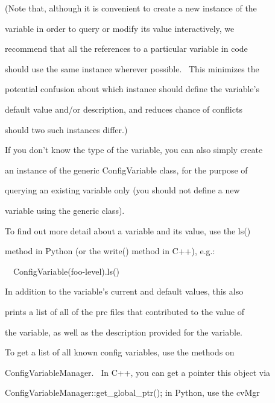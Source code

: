 \documentclass[a4paper]{article}
\begin{document}
{\color{black}
(Note that, although it is convenient to create a new instance of the}

{\color{black}
variable in order to query or modify its value interactively, we}

{\color{black}
recommend that all the references to a particular variable in code}

{\color{black}
should use the same instance wherever possible. \ This minimizes the}

{\color{black}
potential confusion about which instance should define the variable's}

{\color{black}
default value and/or description, and reduces chance of conflicts}

{\color{black}
should two such instances differ.)}


\bigskip

{\color{black}
If you don't know the type of the variable, you can also simply create}

{\color{black}
an instance of the generic ConfigVariable class, for the purpose of}

{\color{black}
querying an existing variable only (you should not define a new}

{\color{black}
variable using the generic class).}


\bigskip

{\color{black}
To find out more detail about a variable and its value, use the ls()}

{\color{black}
method in Python (or the write() method in C++), e.g.:}


\bigskip

{\color{black}
\ \ ConfigVariable({\textquotedbl}foo-level{\textquotedbl}).ls()}


\bigskip

{\color{black}
In addition to the variable's current and default values, this also}

{\color{black}
prints a list of all of the prc files that contributed to the value of}

{\color{black}
the variable, as well as the description provided for the variable.}


\bigskip

{\color{black}
To get a list of all known config variables, use the methods on}

{\color{black}
ConfigVariableManager. \ In C++, you can get a pointer this object via}

{\color{black}
ConfigVariableManager::get\_global\_ptr(); in Python, use the cvMgr}
\end{document}
